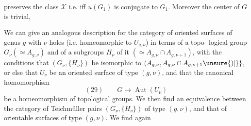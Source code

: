 preserves the class $\mathcal X$ i.e. iff $u(G_1)$ is conjugate
to $G_1$. Moreover the center of $G$ is trivial, 

We can give an analogous description
for the category of oriented surfaces of
genus $g$ with $\nu$ holes (i.e. homeomorphic
to $U_{g,\nu}$) in terms of a topo-
logical group $G_\nu(\simeq A_{g,\nu})$ and of a 
subgroups $H_\nu$ of it $(\simeq A_{g,\nu}\cap A_{g,\nu+1})$, with the
conditions that $(G_\nu,\{H_\nu\})$ be isomorphic
to $(A_{g,\nu},A_{g,\nu}\cap A_{g,\nu+1}\unsure{)|\}}$, or else
that $U_\nu$  be an oriented surface of
type $(g,\nu)$, and that the canonical homomorphism
\[
(29)\qquad G\longrightarrow\operatorname{Aut}(U_\nu)
\]
be a homeomorphism of topological
groups. We then find an
equivalence between the category of
Teichmüller pairs $(G_\nu,\{H_\nu\})$
of type $(g,\nu)$, and that of
orientable surfaces of type $(g,\nu)$. We find again